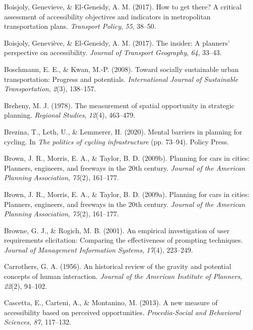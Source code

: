 \documentclass[
11pt, %
oneside, %
english, %
singlespacing, %
]{macthesis} %
\newlength{\cslhangindent}
\newenvironment{CSLReferences}[2] %
 {%
  \setlength{\parindent}{0pt}
  \ifodd #1 \everypar{\setlength{\hangindent}{\cslhangindent}}\ignorespaces\fi
  \ifnum #2 > 0
  \setlength{\parskip}{#2\baselineskip}
  \fi
 }%
 {}
\begin{document}
\begin{CSLReferences}{1}{0}
Boisjoly, Genevieve, \& El-Geneidy, A. M. (2017). How to get there? A critical assessment of accessibility objectives and indicators in metropolitan transportation plans. \emph{Transport Policy}, \emph{55}, 38--50.

Boisjoly, Geneviève, \& El-Geneidy, A. M. (2017). The insider: A planners' perspective on accessibility. \emph{Journal of Transport Geography}, \emph{64}, 33--43.

Boschmann, E. E., \& Kwan, M.-P. (2008). Toward socially sustainable urban transportation: Progress and potentials. \emph{International Journal of Sustainable Transportation}, \emph{2}(3), 138--157.

Breheny, M. J. (1978). The measurement of spatial opportunity in strategic planning. \emph{Regional Studies}, \emph{12}(4), 463--479.

Brezina, T., Leth, U., \& Lemmerer, H. (2020). Mental barriers in planning for cycling. In \emph{The politics of cycling infrastructure} (pp. 73--94). Policy Press.

Brown, J. R., Morris, E. A., \& Taylor, B. D. (2009b). Planning for cars in cities: Planners, engineers, and freeways in the 20th century. \emph{Journal of the American Planning Association}, \emph{75}(2), 161--177.

Brown, J. R., Morris, E. A., \& Taylor, B. D. (2009a). Planning for cars in cities: Planners, engineers, and freeways in the 20th century. \emph{Journal of the American Planning Association}, \emph{75}(2), 161--177.

Browne, G. J., \& Rogich, M. B. (2001). An empirical investigation of user requirements elicitation: Comparing the effectiveness of prompting techniques. \emph{Journal of Management Information Systems}, \emph{17}(4), 223--249.

Carrothers, G. A. (1956). An historical review of the gravity and potential concepts of human interaction. \emph{Journal of the American Institute of Planners}, \emph{22}(2), 94--102.

Cascetta, E., Carteni, A., \& Montanino, M. (2013). A new measure of accessibility based on perceived opportunities. \emph{Procedia-Social and Behavioral Sciences}, \emph{87}, 117--132.


\end{CSLReferences}
\end{document}
